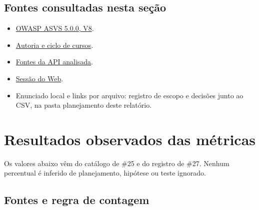 \subsection{Fontes consultadas nesta
seção}\label{fontes-consultadas-nesta-seuxe7uxe3o}

\begin{itemize}
\tightlist
\item
  \href{https://github.com/OWASP/ASVS/blob/v5.0.0/5.0/en/0x17-V8-Authorization.md}{OWASP
  ASVS 5.0.0, V8}.
\item
  \href{https://github.com/ErasmusEgalitarian/educado-docs/blob/1bfc8d23177a171669cf3e491a4996cee21e3310/docs/backlog/ep_02/fe_04.md}{Autoria
  e ciclo de cursos}.
\item
  \href{https://github.com/ErasmusEgalitarian/educado-api/tree/399131a808ed76b3910f9fc1ab3db34ddc0f0d56/src}{Fontes
  da API analisada}.
\item
  \href{https://github.com/ErasmusEgalitarian/educado-web/blob/1131060f370f2c57eaeed2cd541f8af6fae8376c/src/shared/api/auth-session.ts}{Sessão
  do Web}.
\item
  Enunciado local e links por arquivo: registro de escopo e decisões
  junto ao CSV, na pasta planejamento deste relatório.
\end{itemize}

\section{Resultados observados das
métricas}\label{resultados-observados-das-muxe9tricas}

Os valores abaixo vêm do catálogo de \#25 e do registro de \#27. Nenhum
percentual é inferido de planejamento, hipótese ou teste ignorado.

\subsection{Fontes e regra de
contagem}\label{fontes-e-regra-de-contagem}

